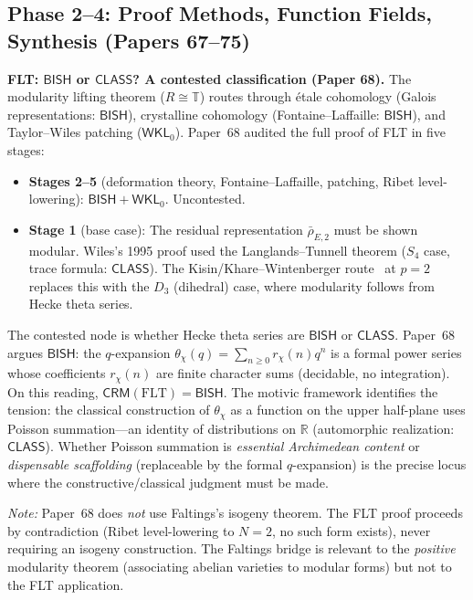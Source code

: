 \documentclass[11pt,a4paper]{article}
\theoremstyle{plain}
\theoremstyle{definition}
\newcommand{\BISH}{\textsf{BISH}}
\newcommand{\WKL}{\textsf{WKL}_0}
\newcommand{\CLASS}{\textsf{CLASS}}
\newcommand{\CRM}{\textsf{CRM}}
\newcommand{\R}{\mathbb{R}}
\begin{document}
\subsection{Phase 2--4: Proof Methods, Function Fields, Synthesis (Papers 67--75)}\label{app:proof-methods}

\noindent\textbf{FLT: $\BISH$ or $\CLASS$? A contested classification (Paper 68).} The modularity lifting theorem ($R \cong \mathbb{T}$) routes through \'etale cohomology (Galois representations: $\BISH$), crystalline cohomology (Fontaine--Laffaille: $\BISH$), and Taylor--Wiles patching ($\WKL$). Paper~68 audited the full proof of FLT in five stages:
\begin{itemize}
\item \textbf{Stages 2--5} (deformation theory, Fontaine--Laffaille, patching, Ribet level-lowering): $\BISH + \WKL$. Uncontested.
\item \textbf{Stage 1} (base case): The residual representation $\bar{\rho}_{E,2}$ must be shown modular. Wiles's 1995 proof used the Langlands--Tunnell theorem ($S_4$ case, trace formula: $\CLASS$). The Kisin/Khare--Wintenberger route~\cite{kisin09} at $p = 2$ replaces this with the $D_3$ (dihedral) case, where modularity follows from Hecke theta series.
\end{itemize}

\noindent The contested node is whether Hecke theta series are $\BISH$ or $\CLASS$. Paper~68 argues $\BISH$: the $q$-expansion $\theta_\chi(q) = \sum_{n \geq 0} r_\chi(n) q^n$ is a formal power series whose coefficients $r_\chi(n)$ are finite character sums (decidable, no integration). On this reading, $\CRM(\mathrm{FLT}) = \BISH$. The motivic framework identifies the tension: the classical construction of $\theta_\chi$ as a function on the upper half-plane uses Poisson summation---an identity of distributions on $\R$ (automorphic realization: $\CLASS$). Whether Poisson summation is \emph{essential Archimedean content} or \emph{dispensable scaffolding} (replaceable by the formal $q$-expansion) is the precise locus where the constructive/classical judgment must be made.

\emph{Note:} Paper~68 does \emph{not} use Faltings's isogeny theorem. The FLT proof proceeds by contradiction (Ribet level-lowering to $N = 2$, no such form exists), never requiring an isogeny construction. The Faltings bridge is relevant to the \emph{positive} modularity theorem (associating abelian varieties to modular forms) but not to the FLT application.
\end{document}
